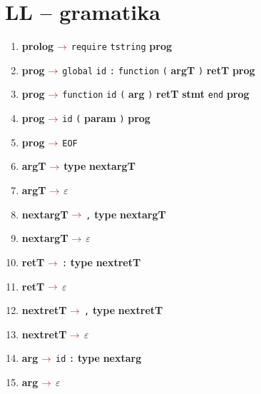 \documentclass[a4paper, 11pt]{article}
\def\nonterm #1{\boldmath{$<$}\textbf{#1}\boldmath{$>$}\space}
\def\term #1{\texttt{#1}\space}
\newcommand{\arrow} {$\color{red} \rightarrow$\space}
\newcommand{\unsc} {\underline{\hspace{0.2cm}}}
\begin{document}
    \section*{LL -- gramatika}
    \begin{enumerate}[label=\textcolor{red}{\arabic*.}]
        \item \nonterm{prolog} \arrow{} \term{require} \term{t\unsc{}string} \nonterm{prog}

        \item \nonterm{prog} \arrow{} \term{global} \term{id} \term{:} \term{function} \term{(} \nonterm{arg\unsc{}T} \term{)} \nonterm{ret\unsc{}T} \nonterm{prog}

        \item \nonterm{prog} \arrow{} \term{function} \term{id} \term{(} \nonterm{arg} \term{)} \nonterm{ret\unsc{}T} \nonterm{stmt} \term{end} \nonterm{prog}

        \item \nonterm{prog} \arrow{} \term{id} \term{(} \nonterm{param} \term{)} \nonterm{prog}
        \item \nonterm{prog} \arrow{} \term{EOF}

        \item \nonterm{arg\unsc{}T} \arrow{} \nonterm{type} \nonterm{next\unsc{}arg\unsc{}T}
        \item \nonterm{arg\unsc{}T} \arrow{} \term{$\varepsilon$}

        \item \nonterm{next\unsc{}arg\unsc{}T} \arrow{} \term{,} \nonterm{type} \nonterm{next\unsc{}arg\unsc{}T}

        \item \nonterm{next\unsc{}arg\unsc{}T} \arrow{} \term{$\varepsilon$}

        \item \nonterm{ret\unsc{}T} \arrow{} \term{:} \nonterm{type} \nonterm{next\unsc{}ret\unsc{}T}

        \item \nonterm{ret\unsc{}T} \arrow{} \term{$\varepsilon$}

        \item \nonterm{next\unsc{}ret\unsc{}T} \arrow{} \term{,} \nonterm{type} \nonterm{next\unsc{}ret\unsc{}T}

        \item \nonterm{next\unsc{}ret\unsc{}T} \arrow{} \term{$\varepsilon$}

        \item \nonterm{arg} \arrow{} \term{id} \term{:} \nonterm{type} \nonterm{next\unsc{}arg}
        \item \nonterm{arg} \arrow{} \term{$\varepsilon$}


\end{enumerate}
\end{document}
